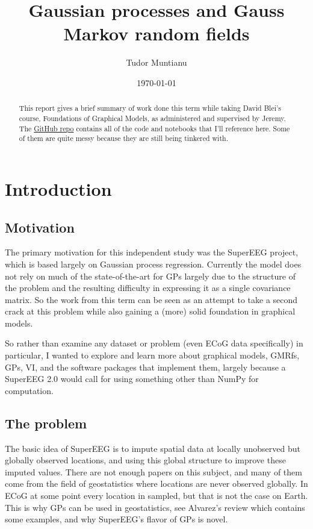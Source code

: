 \documentclass{article}
\begin{document}
\title{Gaussian processes and Gauss Markov random fields}
\date{\today}
\author{Tudor Muntianu}
\maketitle

\begin{abstract}
This report gives a brief summary of work done this term while taking David
Blei's course, Foundations of Graphical Models, as administered and supervised
by Jeremy. The \href{https://github.com/tmuntianu/gmrfs}{GitHub repo} contains
all of the code and notebooks that I'll reference here. Some of them are quite
messy because they are still being tinkered with.
\end{abstract}

\section{Introduction}
\subsection{Motivation}
The primary motivation for this independent study was the SuperEEG project, which
is based largely on Gaussian process regression. Currently the model does not
rely on much of the state-of-the-art for GPs largely due to the structure of
the problem and the resulting difficulty in expressing it as a single covariance
matrix. So the work from this term can be seen as an attempt to take a second
crack at this problem while also gaining a (more) solid foundation in graphical
models.

So rather than examine any dataset or problem (even ECoG data specifically)
in particular, I wanted to explore and learn more about graphical models, GMRfs, GPs, VI, and the
software packages that implement them, largely because a SuperEEG 2.0 would
call for using something other than NumPy for computation.

\subsection{The problem}
The basic idea of SuperEEG is to impute spatial data at locally unobserved
but globally observed locations, and using this global structure to improve these
imputed values. There are not enough papers on this subject, and many of them
come from the field of geostatistics where locations are never observed globally.
In ECoG at some point every location in sampled, but that is not the case on Earth.
This is why GPs can be used in geostatistics, see Alvarez's review\cite{alvarez2012kernels} which contains some examples,
and why SuperEEG's flavor of GPs is novel.
\end{document}
